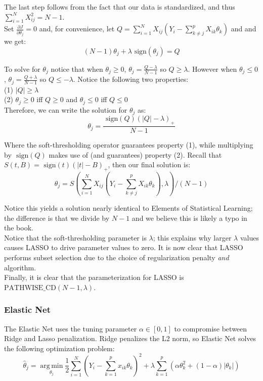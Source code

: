 \documentclass[11pt]{article}
\newcommand{\thh}{\hat{\theta}}
\newcommand{\sgn}{\text{ sign}}
\DeclareMathOperator*{\argmin}{arg\,min}
\newcommand{\pcd}{\text{PATHWISE\_CD}}
\begin{document}
The last step follows from the fact that our data is standardized, and thus $\sum\limits_{i=1}^NX_{ij}^2 = N-1$.  \\

Set $\frac{\partial J}{\partial \theta_j}=0$ and, for convenience, let $Q = \sum\limits_{i=1}^N X_{ij}(Y_i - \sum\limits_{k \ne j}^p X_{ik}\theta_k)$ and and we get:
	$$(N-1)\theta_j + \lambda\sgn(\theta_j) = Q$$

To solve for $\theta_j$ notice that when $\theta_j \geq 0$, $\theta_j=\frac{Q-\lambda}{N-1}$ so $Q \geq \lambda$.  However when $\theta_j \leq 0$, $\theta_j=\frac{Q+\lambda}{N-1}$ so $Q \leq -\lambda$.  Notice the following two properties: \\
	\hspace*{1cm} (1) $|Q| \geq \lambda$ \\
	\hspace*{1cm} (2) $\theta_j \geq 0$ iff $Q \geq 0$ and $\theta_j \leq 0$ iff $Q \leq 0$ \\

Therefore, we can write the solution for $\theta_j$ as:
	$$\theta_j = \frac{\sgn(Q)(|Q|-\lambda)_+}{N-1}$$

Where the soft-thresholding operator guarantees property (1), while multiplying by $\sgn(Q)$ makes use of (and guarantees) property (2).  Recall that $S(t,B) = \sgn(t)(|t|-B)_+$, then our final solution is:
	$$\theta_j = S\left(\sum\limits_{i=1}^N X_{ij}(Y_i - \sum\limits_{k \ne j}^p X_{ik}\theta_k), \lambda\right)/(N-1)$$

Notice this yields a solution nearly identical to Elements of Statistical Learning\cite{ht}; the difference is that we divide by $N-1$ and we believe this is likely a typo in the book.  \\

Notice that the soft-thresholding parameter is $\lambda$; this explains why larger $\lambda$ values causes LASSO to drive parameter values to zero.  It is now clear that LASSO performs subset selection due to the choice of regularization penalty \textit{and} algorithm.  \\

Finally, it is clear that the parameterization for LASSO is $\pcd(N-1,\lambda)$.  


\subsubsection{Elastic Net}
The Elastic Net uses the tuning parameter $\alpha \in [0,1]$ to compromise between Ridge and Lasso penalization.  Ridge penalizes the L2 norm, so Elastic Net solves the following optimization problem:
	$$\thh_j = \argmin\limits_{\theta_j} \frac{1}{2} \sum\limits_{i=1}^N \left(Y_i - \sum\limits_{k=1}^px_{ik}\theta_k \right)^2 + \lambda \sum\limits_{k=1}^p \left(\alpha\theta_k^2 + (1-\alpha)|\theta_k| \right)$$
\end{document}
